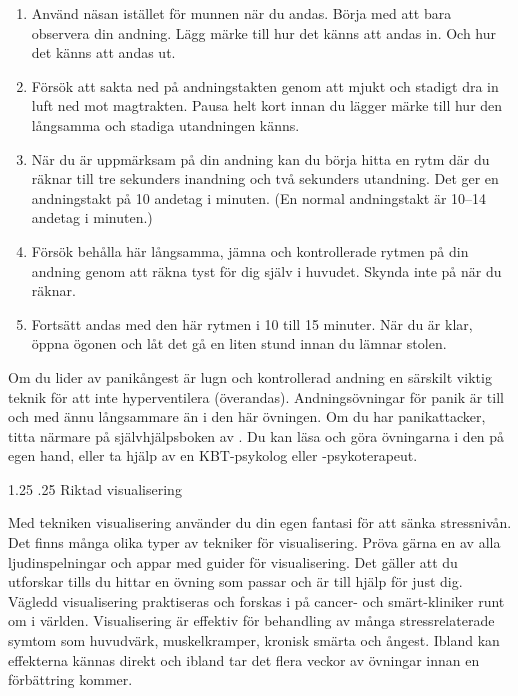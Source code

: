 \documentclass[swedish,a4paper]{book}
\makeatletter
\renewcommand\section{\@startsection{section}{1}{\z@}%
                                   {1.25\baselineskip}%
                                   {.25\baselineskip}%
                                   {\fontsize{1.25\baselineskip}{1.25\baselineskip}\selectfont\sffamily\bfseries}} %
\makeatother
\begin{document}
\begin{enumerate}

\item Använd näsan istället för munnen när du andas. Börja med att bara observera din andning. Lägg märke till hur det känns att andas in. Och hur det känns att andas ut.

\item Försök att sakta ned på andningstakten genom att mjukt och stadigt dra in luft ned mot magtrakten. Pausa helt kort innan du lägger märke till hur den långsamma och stadiga utandningen känns.

\item När du är uppmärksam på din andning kan du börja hitta en rytm där du räknar till tre sekunders inandning och två sekunders utandning. Det ger en andningstakt på 10 andetag i minuten. (En normal andningstakt är 10--14 andetag i minuten.)

\item Försök behålla här långsamma, jämna och kontrollerade rytmen på din andning genom att räkna tyst för dig själv i huvudet. Skynda inte på när du räknar.

\item Fortsätt andas med den här rytmen i 10 till 15 minuter. När du är klar, öppna ögonen och låt det gå en liten stund innan du lämnar stolen.

\end{enumerate}

Om du lider av panikångest är lugn och kontrollerad andning en särskilt viktig teknik för att inte hyperventilera (överandas). Andningsövningar för panik är till och med ännu långsammare än i den här övningen. Om du har panikattacker, titta närmare på självhjälpsboken  av \textcite{carlbring2013ingen}. Du kan läsa och göra övningarna i den på egen hand, eller ta hjälp av en KBT-psykolog eller -psykoterapeut.

\section{Riktad visualisering}

Med tekniken visualisering använder du din egen fantasi för att sänka stressnivån. Det finns många olika typer av tekniker för visualisering. Pröva gärna en av alla ljudinspelningar och appar med guider för visualisering. Det gäller att du utforskar tills du hittar en övning som passar och är till hjälp för just dig. Vägledd visualisering praktiseras och forskas i på cancer- och smärt-kliniker runt om i världen. Visualisering är effektiv för behandling av många stressrelaterade symtom som huvudvärk, muskelkramper, kronisk smärta och ångest. Ibland kan effekterna kännas direkt och ibland tar det flera veckor av övningar innan en förbättring kommer.
\end{document}
